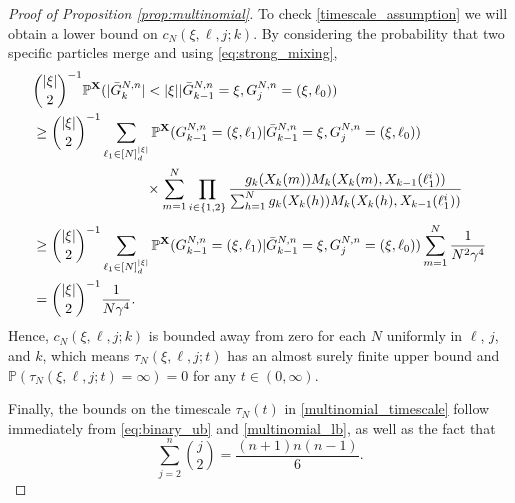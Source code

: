 \documentclass[a4paper,11pt]{article}
\theoremstyle{definition}
\newcommand{\bbP}{\mathbb{P}}
\newcommand{\bfX}{\mathbf{X}}
\begin{document}
\begin{proof}[Proof of Proposition \ref{prop:multinomial}]
To check \eqref{timescale_assumption} we will obtain a lower bound on $c_N( \xi, \ell, j; k )$.
By considering the probability that two specific particles merge and using \eqref{eq:strong_mixing},
\begin{align}
&\binom{ | \xi | }{ 2 }^{ -1 } \bbP^{ \bfX }( | \bar{ G }_k^{ N, n } | < | \xi | | \bar{ G }_{ k - 1 }^{ N, n } = \xi, G_j^{ N, n } = ( \xi, \ell_0 ) ) \notag \\
&\geq \binom{ | \xi | }{ 2 }^{ -1 } \sum_{ \ell_1 \in [ N ]_d^{ | \xi | } } \bbP^{ \bfX }( G_{ k - 1 }^{ N, n } = ( \xi, \ell_1 ) | \bar{ G }_{ k - 1 }^{ N, n } = \xi, G_j^{ N, n } = ( \xi, \ell_0 ) ) \notag \\
&\phantom{ = \binom{ | \xi | }{ 2 }^{ -1 } \sum_{ \ell_1 \in [ N ]_d^{ | \xi | } } } \times \sum_{ m = 1 }^N \prod_{ i \in \{ 1, 2 \} } \frac{ g_k( X_k( m ) ) M_k( X_k( m ), X_{ k - 1 }( \ell_1^i ) ) }{ \sum_{ h = 1 }^N g_k( X_k( h ) ) M_k( X_k( h ), X_{ k - 1 }( \ell_1^i ) ) } \label{multinomial_lb} \\
&\geq \binom{ | \xi | }{ 2 }^{ -1 } \sum_{ \ell_1 \in [ N ]_d^{ | \xi | } } \bbP^{ \bfX }( G_{ k - 1 }^{ N, n } = ( \xi, \ell_1 ) | \bar{ G }_{ k - 1 }^{ N, n } = \xi, G_j^{ N, n } = ( \xi, \ell_0 ) ) \sum_{ m = 1 }^N \frac{ 1 }{ N^2 \gamma^4 } \notag \\
&= \binom{ | \xi | }{ 2 }^{ -1 } \frac{ 1 }{ N \gamma^4 }. \notag
\end{align}
Hence, $c_N( \xi, \ell, j; k )$ is bounded away from zero for each $N$ uniformly in $\ell$, $j$, and $k$, which means $\tau_N( \xi, \ell, j; t )$ has an almost surely finite upper bound and $\bbP( \tau_N( \xi, \ell, j; t ) = \infty ) = 0$ for any $t \in ( 0, \infty )$.

Finally, the bounds on the timescale $\tau_N(t)$ in \eqref{multinomial_timescale} follow immediately from \eqref{eq:binary_ub} and \eqref{multinomial_lb}, as well as the fact that
\begin{equation}\label{binomial_sum}
\sum_{j = 2}^n \binom{j}{2} = \frac{(n + 1) n (n - 1)}{6}.
\end{equation}
\end{proof}
\end{document}
